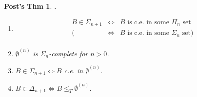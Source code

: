 \documentclass[12pt]{article}
\begin{document}
\newtheorem*{pthm}{Post's Thm}
\begin{pthm} .
\begin{enumerate}[(1)]
 \item 
  \begin{align*}
   B \in \Sigma_{n+1} &\Leftrightarrow& B \text{ is c.e. in some $\Pi_n$ set} \\
   (&\Leftrightarrow& B \text{ is c.e. in some $\Sigma_n$ set} )\\
  \end{align*}
 \item
  $\emptyset^{(n)}$ is $\Sigma_n$-complete for $n >0$.
 \item
  $B \in \Sigma_{n+1} \Leftrightarrow B$ c.e. in $\emptyset^{(n)}$.
 \item
  $B \in \Delta_{n+1} \Leftrightarrow B \le_T \emptyset^{(n)}$.
\end{enumerate}
\end{pthm}
\end{document}
